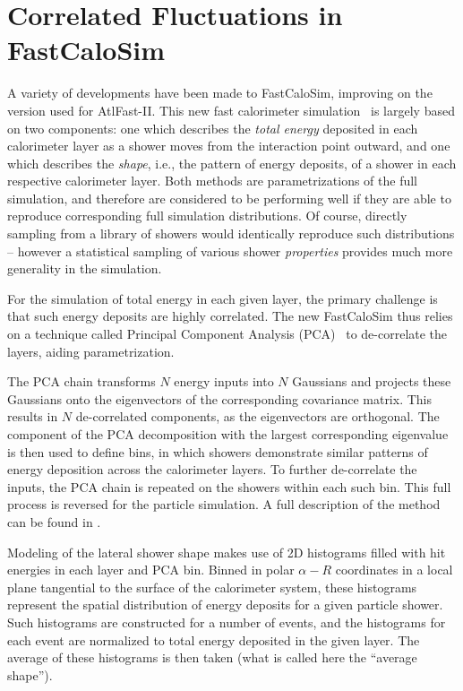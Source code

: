 \section{Correlated Fluctuations in FastCaloSim}
\label{shapepara}
A variety of developments have been made to FastCaloSim, improving on the version used 
for AtlFast-II. This new fast calorimeter simulation~\cite{ATL-SOFT-PUB-2018-002} is largely 
based on two components: one which describes the \emph{total energy} deposited in each calorimeter layer as a 
shower moves from the interaction point outward, and one which describes the \emph{shape}, i.e., the 
pattern of energy deposits, of a shower in each respective calorimeter layer. Both methods are 
parametrizations of the full simulation, and therefore are considered to be performing well if 
they are able to reproduce corresponding full simulation distributions. Of course, directly sampling 
from a library of showers would identically reproduce such distributions -- however a statistical 
sampling of various shower \emph{properties} provides much more generality in the simulation.

For the simulation of total energy in each given layer, the primary challenge is that such energy deposits are highly correlated. The new FastCaloSim thus relies on a technique called Principal Component Analysis (PCA)~\cite{TPrincipal} to de-correlate the layers, aiding parametrization.

The PCA chain transforms $N$ energy inputs into $N$ Gaussians and projects these Gaussians onto the eigenvectors of the corresponding covariance matrix. This results in $N$ de-correlated components, as the eigenvectors are orthogonal. The component of the PCA decomposition with the largest corresponding eigenvalue is then used to define bins, in which showers demonstrate similar patterns of energy deposition across the calorimeter layers. To further de-correlate the inputs, the PCA chain is repeated on the showers within each such bin. This full process is reversed for the particle simulation. A full description of the method can be found in \cite{ATL-SOFT-PUB-2018-002}.

Modeling of the lateral shower shape makes use of 2D histograms filled with \GEANT hit energies in each layer and PCA bin.
Binned in polar $\alpha-R$ coordinates in a local plane tangential to the surface of the calorimeter system, these histograms 
represent the spatial distribution of energy deposits for a given particle shower. Such histograms are constructed for a 
number of \GEANT events, and the histograms for each event are normalized to total energy deposited in the given layer. The 
average of these histograms is then taken (what is called here the ``average shape'').

